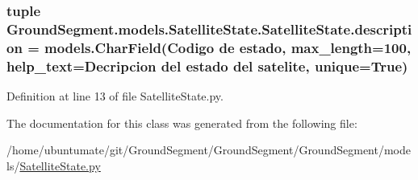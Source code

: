 \subsubsection[{description}]{\setlength{\rightskip}{0pt plus 5cm}tuple Ground\+Segment.\+models.\+Satellite\+State.\+Satellite\+State.\+description = models.\+Char\+Field(\textquotesingle{}Codigo de estado\textquotesingle{}, max\+\_\+length=100, help\+\_\+text=\textquotesingle{}Decripcion del estado del satelite\textquotesingle{}, unique=True)\hspace{0.3cm}{\ttfamily [static]}}\label{class_ground_segment_1_1models_1_1_satellite_state_1_1_satellite_state_ac5038d32f285e6fd1da34bc7ed716495}


Definition at line 13 of file Satellite\+State.\+py.



The documentation for this class was generated from the following file\+:\begin{DoxyCompactItemize}
\item 
/home/ubuntumate/git/\+Ground\+Segment/\+Ground\+Segment/\+Ground\+Segment/models/\hyperlink{_satellite_state_8py}{Satellite\+State.\+py}\end{DoxyCompactItemize}
